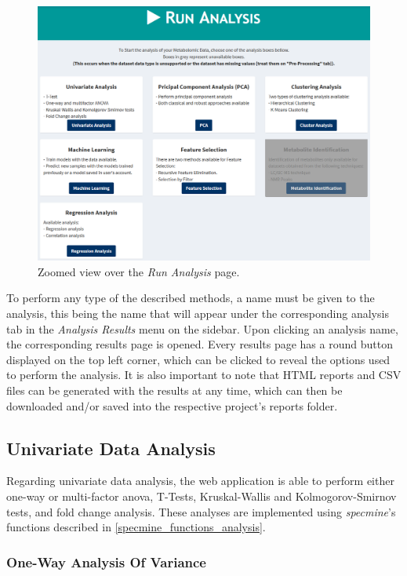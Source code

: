 \begin{figure}[h]
	\centering
	\includegraphics[width=1\linewidth]{Imagens/webspecmine_runanalysis}
	\caption{Zoomed view over the \textit{Run Analysis} page.}
	\label{webspecmine_runanalysis}
\end{figure}

To perform any type of the described methods, a name must be given to the analysis, this being the name that will appear under the corresponding analysis tab in the \textit{Analysis Results} menu on the sidebar. Upon clicking an analysis name, the corresponding results page is opened. Every results page has a round button displayed on the top left corner, which can be clicked to reveal the options used to perform the analysis. It is also important to note that HTML reports and CSV files can be generated with the results at any time, which can then be downloaded and/or saved into the respective project's reports folder. 


\subsection{Univariate Data Analysis}

Regarding univariate data analysis, the web application is able to perform either one-way or multi-factor \gls{anova}, T-Tests, Kruskal-Wallis and Kolmogorov-Smirnov tests, and fold change analysis. These analyses are implemented  using \textit{specmine}'s functions described in \autoref{specmine_functions_analysis}. 

\subsubsection{One-Way Analysis Of Variance}

